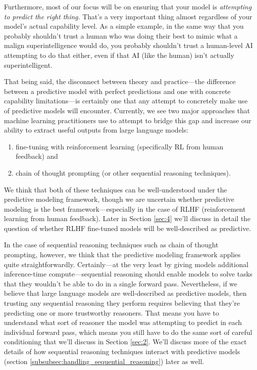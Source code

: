 \documentclass[
  twocolumn,
  natbib,
]{miri-tech-article}
\begin{document}
Furthermore, most of our focus will be on ensuring that your model is \textit{attempting to predict the right thing.} That's a very important thing almost regardless of your model's actual capability level. As a simple example, in the same way that you probably shouldn't trust a human who was doing their best to mimic what a malign superintelligence would do, you probably shouldn't trust a human-level AI attempting to do that either, even if that AI (like the human) isn't actually superintelligent.

That being said, the disconnect between theory and practice---the difference between a predictive model with perfect predictions and one with concrete capability limitations---is certainly one that any attempt to concretely make use of predictive models will encounter. Currently, we see two major approaches that machine learning practitioners use to attempt to bridge this gap and increase our ability to extract useful outputs from large language models:



\begin{enumerate}
\item fine-tuning with reinforcement learning\cite{deep_RL_human_pref} (specifically RL from human feedback) and
\item chain of thought prompting\cite{chain_of_thought} (or other sequential reasoning techniques).
\end{enumerate}

We think that both of these techniques can be well-understood under the predictive modeling framework, though we are uncertain whether predictive modeling is the best framework---especially in the case of RLHF (reinforcement learning from human feedback). Later in Section \ref{sec:4} we'll discuss in detail the question of whether RLHF fine-tuned models will be well-described as predictive.

In the case of sequential reasoning techniques such as chain of thought prompting, however, we think that the predictive modeling framework applies quite straightforwardly. Certainly---at the very least by giving models additional inference-time compute---sequential reasoning should enable models to solve tasks that they wouldn't be able to do in a single forward pass. Nevertheless, if we believe that large language models are well-described as predictive models, then trusting any sequential reasoning they perform requires believing that they're predicting one or more trustworthy reasoners. That means you have to understand what sort of reasoner the model was attempting to predict in each individual forward pass, which means you still have to do the same sort of careful conditioning that we'll discuss in Section \ref{sec:2}. We'll discuss more of the exact details of how sequential reasoning techniques interact with predictive models (section \ref{subsubsec:handling_sequential_reasoning}) later as well.
\end{document}
